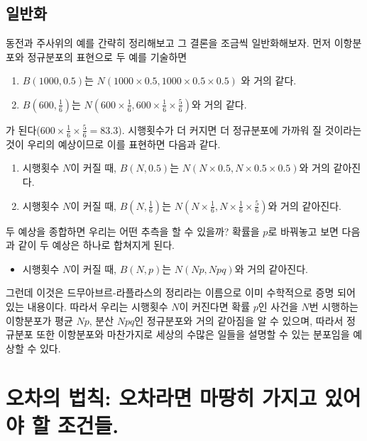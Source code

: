 \documentclass[]{book}
\providecommand{\tightlist}{%
  \setlength{\itemsep}{0pt}\setlength{\parskip}{0pt}}
\begin{document}
\subsection{일반화}\label{uxc77cuxbc18uxd654}

동전과 주사위의 예를 간략히 정리해보고 그 결론을 조금씩 일반화해보자.
먼저 이항분포와 정규분포의 표현으로 두 예를 기술하면

\begin{enumerate}
\def\labelenumi{\arabic{enumi}.}
\tightlist
\item
  \(B(1000,0.5)\)는 \(N(1000\times 0.5, 1000\times 0.5 \times 0.5)\) 와
  거의 같다.
\item
  \(B(600,\frac{1}{6})\)는
  \(N(600\times \frac{1}{6}, 600\times \frac{1}{6} \times \frac{5}{6})\)와
  거의 같다.
\end{enumerate}

가 된다(\(600\times \frac{1}{6} \times \frac{5}{6}=83.3\)). 시행횟수가
더 커지면 더 정규분포에 가까워 질 것이라는 것이 우리의 예상이므로 이를
표현하면 다음과 같다.

\begin{enumerate}
\def\labelenumi{\arabic{enumi}.}
\tightlist
\item
  시행횟수 \(N\)이 커질 때, \(B(N,0.5)\)는
  \(N(N \times 0.5, N \times 0.5 \times 0.5)\)와 거의 같아진다.
\item
  시행횟수 \(N\)이 커질 때, \(B(N,\frac{1}{6})\)는
  \(N(N \times \frac{1}{6}, N \times \frac{1}{6} \times \frac{5}{6})\)와
  거의 같아진다.
\end{enumerate}

두 예상을 종합하면 우리는 어떤 추측을 할 수 있을까? 확률을 \(p\)로
바꿔놓고 보면 다음과 같이 두 예상은 하나로 합쳐지게 된다.

\begin{itemize}
\tightlist
\item
  시행횟수 \(N\)이 커질 때, \(B(N,p)\)는 \(N(Np, Npq)\)와 거의 같아진다.
\end{itemize}

그런데 이것은 드무아브르-라플라스의 정리라는 이름으로 이미 수학적으로
증명 되어 있는 내용이다. 따라서 우리는 시행횟수 \(N\)이 커진다면 확률
\(p\)인 사건을 \(N\)번 시행하는 이항분포가 평균 \(Np\), 분산 \(Npq\)인
정규분포와 거의 같아짐을 알 수 있으며, 따라서 정규분포 또한 이항분포와
마찬가지로 세상의 수많은 일들을 설명할 수 있는 분포임을 예상할 수 있다.

\section{오차의 법칙: 오차라면 마땅히 가지고 있어야 할
조건들.}\label{uxc624uxcc28uxc758-uxbc95uxce59-uxc624uxcc28uxb77cuxba74-uxb9c8uxb545uxd788-uxac00uxc9c0uxace0-uxc788uxc5b4uxc57c-uxd560-uxc870uxac74uxb4e4.}
\end{document}
